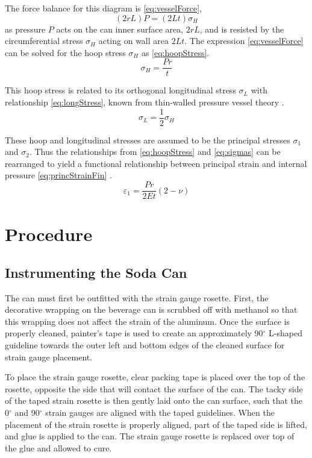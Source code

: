\documentclass[10pt,journal,letterpaper]{IEEEtran}
\begin{document}
The force balance for this diagram is \eqref{eq:vesselForce},
\begin{equation}
\label{eq:vesselForce}
(2rL)P=(2Lt)\sigma_H
\end{equation}
as pressure $P$ acts on the can inner surface area, $2rL$, and is resisted by the circumferential stress $\sigma_H$ acting on wall area $2Lt$.
The expression \eqref{eq:vesselForce} can be solved for the hoop stress $\sigma_H$ as \eqref{eq:hoopStress}.
\begin{equation}
\label{eq:hoopStress}
\sigma_H=\frac{Pr}{t}
\end{equation}

This hoop stress is related to its orthogonal longitudinal stress $\sigma_L$ with relationship \eqref{eq:longStress}, known from thin-walled pressure vessel theory \cite{b1}.
\begin{equation}
\label{eq:longStress}
\sigma_L=\frac{1}{2}\sigma_H
\end{equation}

These hoop and longitudinal stresses are assumed to be the principal stresses $\sigma_1$ and $\sigma_2$.
Thus the relationships from \eqref{eq:hoopStress} and \eqref{eq:sigmas} can be rearranged to yield a functional relationship between principal strain and internal pressure \eqref{eq:princStrainFin} \cite{b1}.
\begin{equation}
\label{eq:princStrainFin}
\varepsilon_1=\frac{Pr}{2Et}(2-\nu)
\end{equation}

\section{Procedure}

\subsection{Instrumenting the Soda Can}

The can must first be outfitted with the strain  gauge rosette.
First, the decorative wrapping on the beverage can is scrubbed off with methanol so that this wrapping does not affect the strain of the aluminum.
Once the surface is properly cleaned, painter's tape is used to create an approximately 90$^\circ$ L-shaped guideline towards the outer left and bottom edges of the cleaned surface for strain gauge placement.

To place the strain gauge rosette, clear packing tape is placed over the top of the rosette, opposite the side that will contact the surface of the can.
The tacky side of the taped strain rosette is then gently laid onto the can surface, such that the 0$^\circ$ and 90$^\circ$ strain gauges are aligned with the taped guidelines.
When the placement of the strain rosette is properly aligned, part of the taped side is lifted, and glue is applied to the can.
The strain gauge rosette is replaced over top of the glue and allowed to cure.
\end{document}
